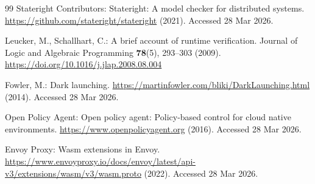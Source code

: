 \documentclass[runningheads]{llncs}
\begin{document}
\begin{thebibliography}{99}
Stateright Contributors:
Stateright: A model checker for distributed systems.
\url{https://github.com/stateright/stateright} (2021).
Accessed 28 Mar 2026.

Leucker, M., Schallhart, C.:
A brief account of runtime verification.
Journal of Logic and Algebraic Programming \textbf{78}(5), 293--303 (2009).
\url{https://doi.org/10.1016/j.jlap.2008.08.004}

Fowler, M.:
Dark launching.
\url{https://martinfowler.com/bliki/DarkLaunching.html} (2014).
Accessed 28 Mar 2026.

Open Policy Agent:
Open policy agent: Policy-based control for cloud native environments.
\url{https://www.openpolicyagent.org} (2016).
Accessed 28 Mar 2026.

Envoy Proxy:
Wasm extensions in Envoy.
\url{https://www.envoyproxy.io/docs/envoy/latest/api-v3/extensions/wasm/v3/wasm.proto} (2022).
Accessed 28 Mar 2026.

\end{thebibliography}
\end{document}
